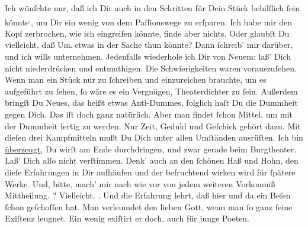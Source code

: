 \pstart
           Ich wünſchte nur, daß ich Dir auch in den Schritten für Dein Stück behilflich{ }ſein könnte\substVorne{}\textsuperscript{.}\substDazwischen{},\substHinten{} um Dir ein wenig von dem Paſſionswege zu erſparen. Ich habe mir den Kopf
               zerbrochen, wie ich eingreifen könnte, finde aber nichts. Oder glaubſt Du vielleicht,
               daß {\pb}\textsc{Uhl} etwas in der Sache thun könnte? Dann{ }ſchreib’ mir darüber, und ich wills
               unternehmen. Jedenfalls wiederhole ich Dir von Neuem: laß’ Dich nicht niederdrücken
               und entmuthigen. Die Schwierigkeiten waren vorauszuſehen. Wenn man ein Stück nur zu{ }ſchreiben und einzureichen brauchte, um es aufgeführt zu{ }ſehen,{ }ſo wäre es ein
               Vergnügen, Theaterdichter zu{ }ſein. Außerdem bringſt Du Neues, das heißt etwas
               Anti-Dummes, folglich haſt Du die Dummheit gegen Dich. Das iſt doch ganz natürlich.
               Aber man findet{ }ſchon Mittel, {\pb}um mit der Dummheit
               fertig zu werden. Nur Zeit, Geduld und Geſchick gehört dazu. Mit dieſen drei
               Kampfmitteln \strikeout{\textcolor{gray}{we}} mußt Du Dich unter allen Umſtänden ausrüſten. Ich bin \uline{überzeugt}, Du wirſt am Ende durchdringen, und zwar gerade beim Burgtheater. Laß’ Dich alſo nicht verſtimmen.
               Denk’ auch an den{ }ſchönen Haß und Hohn, den dieſe Erfahrungen in Dir aufhäufen und
               der befruchtend wirken wird für ſpätere Werke.
               Und, bitte, mach’ mir nach wie vor von jedem weiteren Vorkomniß Mittheilung. \label{K_L02622-6v}\label{K_L02622-6}? {\pb}Vielleicht. \label{K_L02622-7v}\label{K_L02622-7}. Und die Erfahrung lehrt, daß
               hier und da ein Beſen{ }ſchon geſchoſſen hat. Man 
               verleumdet den lieben Gott, wenn man{ }ſo ganz{ }ſeine Exiſtenz leugnet. Ein wenig
               exiſtirt er doch, auch für junge Poeten.\pend
           
